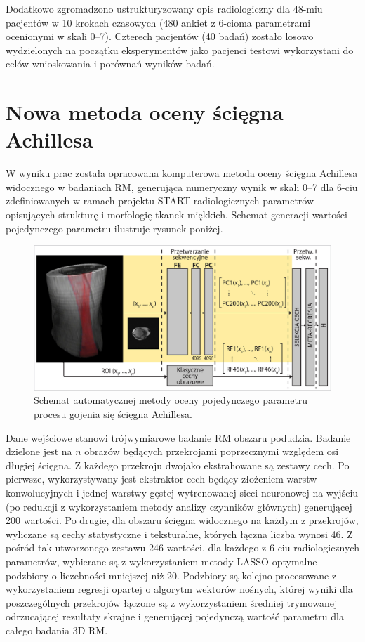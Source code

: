 Dodatkowo zgromadzono ustrukturyzowany opis radiologiczny dla 48-miu pacjentów w 10 krokach czasowych (480 ankiet z 6-cioma parametrami ocenionymi w skali 0--7). Czterech pacjentów (40 badań) zostało losowo wydzielonych na początku eksperymentów jako pacjenci testowi wykorzystani do celów wnioskowania i porównań wyników badań.

{\let\clearpage\relax\chapter*{Nowa metoda oceny ścięgna Achillesa}}

W wyniku prac została opracowana komputerowa metoda oceny ścięgna Achillesa widocznego w badaniach RM, generująca numeryczny wynik w skali 0--7 dla 6-ciu zdefiniowanych w ramach projektu START radiologicznych parametrów opisujących strukturę i morfologię tkanek miękkich. Schemat generacji wartości pojedynczego parametru ilustruje rysunek poniżej. 
\begin{figure}[h!]
	\includegraphics[width=\textwidth]{figures/net.jpg}
	\caption{Schemat automatycznej metody oceny pojedynczego parametru procesu gojenia się ścięgna Achillesa.} \label{fig:net}
\end{figure}

Dane wejściowe stanowi trójwymiarowe badanie RM obszaru podudzia. Badanie dzielone jest na $n$ obrazów będących przekrojami poprzecznymi względem osi długiej ścięgna. Z każdego przekroju dwojako ekstrahowane są zestawy cech. Po pierwsze, wykorzystywany jest ekstraktor cech będący złożeniem warstw konwolucyjnych i jednej warstwy gęstej wytrenowanej sieci neuronowej na wyjściu (po redukcji z wykorzystaniem metody analizy czynników głównych) generującej 200 wartości. Po drugie, dla obszaru ścięgna widocznego na każdym z przekrojów, wyliczane są cechy statystyczne i teksturalne, których łączna liczba wynosi 46. Z pośród tak utworzonego zestawu 246 wartości, dla każdego z 6-ciu radiologicznych parametrów, wybierane są z wykorzystaniem metody LASSO optymalne podzbiory o liczebności mniejszej niż 20. Podzbiory są kolejno procesowane z wykorzystaniem regresji opartej o algorytm wektorów nośnych, której wyniki dla poszczególnych przekrojów łączone są z wykorzystaniem średniej trymowanej odrzucającej rezultaty skrajne i generującej pojedynczą wartość parametru dla całego badania 3D RM.   


